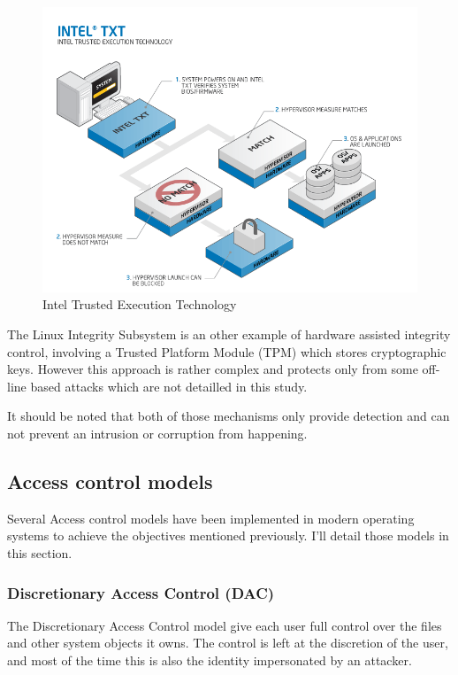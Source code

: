 \documentclass[pdftex,a4paper,titlepage,11pt]{article}
\begin{document}
\begin{figure}[h]
	\centering
	\includegraphics[scale=0.70]{techrefresh-info-txtfull.png}
	\caption{Intel Trusted Execution Technology}
	\label{INTELTXT}
\end{figure}

\smallskip

The Linux Integrity Subsystem \cite{linuxima} is an other example of hardware
assisted integrity control, involving a Trusted Platform Module (TPM) which
stores cryptographic keys. However this approach is rather complex and protects
only from some off-line based attacks which are not detailled in this study.

\bigskip

It should be noted that both of those mechanisms only provide detection and
can not prevent an intrusion or corruption from happening.

\subsection{Access control models}

Several Access control models have been implemented in modern operating systems
to achieve the objectives mentioned previously. I'll detail those models in
this section.

\subsubsection{Discretionary Access Control (DAC)}

The Discretionary Access Control model give each user full control over the
files and other system objects it owns. The control is left at the discretion
of the user, and most of the time this is also the identity impersonated by an
attacker.
\end{document}
